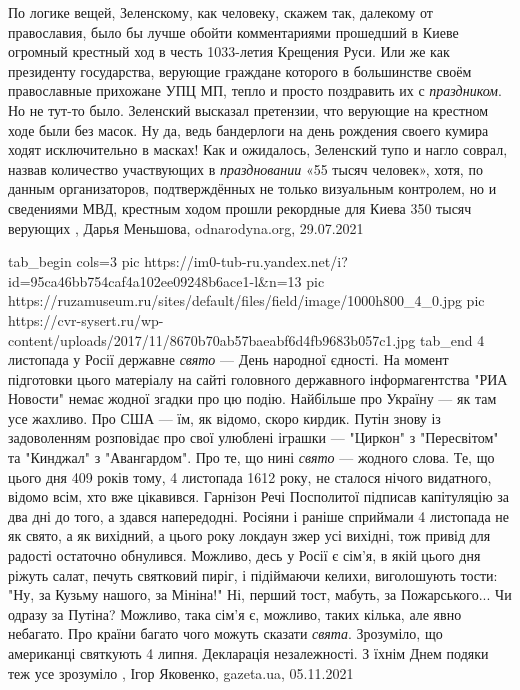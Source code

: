 По логике вещей, Зеленскому, как человеку, скажем так, далекому от православия,
было бы лучше обойти комментариями прошедший в Киеве огромный крестный ход в
честь 1033-летия Крещения Руси. Или же как президенту государства, верующие
граждане которого в большинстве своём православные прихожане УПЦ МП, тепло и
просто поздравить их с \emph{праздником}.  Но не тут-то было.  Зеленский
высказал претензии, что верующие на крестном ходе были без масок. Ну да, ведь
бандерлоги на день рождения своего кумира ходят исключительно в масках! Как и
ожидалось, Зеленский тупо и нагло соврал, назвав количество участвующих в
\emph{праздновании} «55 тысяч человек», хотя, по данным организаторов,
подтверждённых не только визуальным контролем, но и сведениями МВД, крестным
ходом прошли рекордные для Киева 350 тысяч верующих
, 
Дарья Меньшова, odnarodyna.org, 29.07.2021

\ifcmt
  tab_begin cols=3
     pic https://im0-tub-ru.yandex.net/i?id=95ca46bb754caf4a102ee09248b6ace1-l&n=13
     pic https://ruzamuseum.ru/sites/default/files/field/image/1000h800_4_0.jpg
		 pic https://cvr-sysert.ru/wp-content/uploads/2017/11/8670b70ab57baeabf6d4fb9683b057c1.jpg
  tab_end
\fi
4 листопада у Росії державне \emph{свято} — День народної єдності. На момент
підготовки цього матеріалу на сайті головного державного інформагентства "РИА
Новости" немає жодної згадки про цю подію. Найбільше про Україну — як там усе
жахливо. Про США — їм, як відомо, скоро кирдик. Путін знову із задоволенням
розповідає про свої улюблені іграшки — "Циркон" з "Пересвітом" та "Кинджал" з
"Авангардом". Про те, що нині \emph{свято} — жодного слова.  Те, що цього дня
409 років тому, 4 листопада 1612 року, не сталося нічого видатного, відомо
всім, хто вже цікавився. Гарнізон Речі Посполитої підписав капітуляцію за два
дні до того, а здався напередодні. Росіяни і раніше сприймали 4 листопада не як
свято, а як вихідний, а цього року локдаун зжер усі вихідні, тож привід для
радості остаточно обнулився.  Можливо, десь у Росії є сім'я, в якій цього дня
ріжуть салат, печуть святковий пиріг, і підіймаючи келихи, виголошують тости:
"Ну, за Кузьму нашого, за Мініна!" Ні, перший тост, мабуть, за Пожарського...
Чи одразу за Путіна?  Можливо, така сім'я є, можливо, таких кілька, але явно
небагато.  Про країни багато чого можуть сказати \emph{свята}. Зрозуміло, що
американці святкують 4 липня. Декларація незалежності. З їхнім Днем подяки теж
усе зрозуміло
, Ігор Яковенко, gazeta.ua, 05.11.2021
